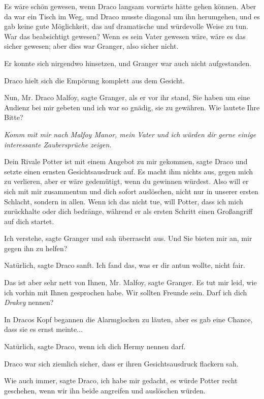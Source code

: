 Es wäre schön gewesen, wenn Draco langsam vorwärts hätte gehen können. Aber da
war ein Tisch im Weg, und Draco musste diagonal um ihn herumgehen, und es gab
keine gute Möglichkeit, das auf dramatische und würdevolle Weise zu tun. War das
beabsichtigt gewesen? Wenn es sein Vater gewesen wäre, wäre es das sicher
gewesen; aber dies war Granger, also sicher nicht.

Er konnte sich nirgendwo hinsetzen, und Granger war auch nicht aufgestanden.

Draco hielt sich die Empörung komplett aus dem Gesicht.

\glqq{}Nun, Mr. Draco Malfoy\grqq{}, sagte Granger, als er vor ihr stand,
\glqq{}Sie haben um eine Audienz bei mir gebeten und ich war so gnädig, sie zu
gewähren. Wie lautete Ihre Bitte?\grqq{}

\emph{Komm mit mir nach Malfoy Manor, mein Vater und ich würden dir gerne einige
interessante Zaubersprüche zeigen.}

\glqq{}Dein Rivale Potter ist mit einem Angebot zu mir gekommen\grqq{}, sagte
Draco und setzte einen ernsten Gesichtsausdruck auf. \glqq{}Es macht ihm nichts
aus, gegen mich zu verlieren, aber er wäre gedemütigt, wenn du gewinnen würdest.
Also will er sich mit mir zusammentun und dich sofort auslöschen, nicht nur in
unserer ersten Schlacht, sondern in allen. Wenn ich das nicht tue, will Potter,
dass ich mich zurückhalte oder dich bedränge, während er als ersten Schritt
einen Großangriff auf dich startet.\grqq{}

\glqq{}Ich verstehe\grqq{}, sagte Granger und sah überrascht aus. \glqq{}Und Sie
bieten mir an, mir gegen ihn zu helfen?\grqq{}

\glqq{}Natürlich\grqq{}, sagte Draco sanft. \glqq{}Ich fand das, was er dir
antun wollte, nicht fair.\grqq{}

\glqq{}Das ist aber sehr nett von Ihnen, Mr. Malfoy\grqq{}, sagte Granger.
\glqq{}Es tut mir leid, wie ich vorhin mit Ihnen gesprochen habe. Wir sollten
Freunde sein. Darf ich dich \emph{Drakey} nennen?\grqq{}

In Dracos Kopf begannen die Alarmglocken zu läuten, aber es gab eine Chance,
dass sie es ernst meinte...

\glqq{}Natürlich\grqq{}, sagte Draco, \glqq{}wenn ich dich Hermy nennen
darf.\grqq{}

Draco war sich ziemlich sicher, dass er ihren Gesichtsausdruck flackern sah.

\glqq{}Wie auch immer\grqq{}, sagte Draco, \glqq{}ich habe mir gedacht, es würde
Potter recht geschehen, wenn wir ihn beide angreifen und auslöschen
würden.\grqq{}

